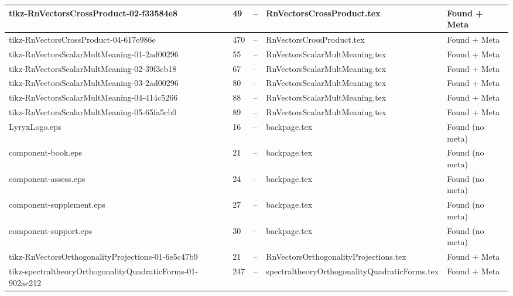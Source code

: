 \documentclass[11pt]{article}
\begin{document}
\begin{longtable}{|p{3.5cm}|p{1.5cm}|p{1cm}|p{4cm}|p{2cm}|}
tikz-RnVectorsCrossProduct-02-f33584e8 & 49 & -- & RnVectorsCrossProduct.tex & \textcolor{found}{Found + Meta} \\
\hline

tikz-RnVectorsCrossProduct-04-617e986e & 470 & -- & RnVectorsCrossProduct.tex & \textcolor{found}{Found + Meta} \\
\hline

tikz-RnVectorsScalarMultMeaning-01-2ad00296 & 55 & -- & RnVectorsScalarMultMeaning.tex & \textcolor{found}{Found + Meta} \\
\hline

tikz-RnVectorsScalarMultMeaning-02-39f3cb18 & 67 & -- & RnVectorsScalarMultMeaning.tex & \textcolor{found}{Found + Meta} \\
\hline

tikz-RnVectorsScalarMultMeaning-03-2ad00296 & 80 & -- & RnVectorsScalarMultMeaning.tex & \textcolor{found}{Found + Meta} \\
\hline

tikz-RnVectorsScalarMultMeaning-04-414c5266 & 88 & -- & RnVectorsScalarMultMeaning.tex & \textcolor{found}{Found + Meta} \\
\hline

tikz-RnVectorsScalarMultMeaning-05-65fa5cb0 & 89 & -- & RnVectorsScalarMultMeaning.tex & \textcolor{found}{Found + Meta} \\
\hline

LyryxLogo.eps & 16 & -- & backpage.tex & \textcolor{warning}{Found (no meta)} \\
\hline

component-book.eps & 21 & -- & backpage.tex & \textcolor{warning}{Found (no meta)} \\
\hline

component-assess.eps & 24 & -- & backpage.tex & \textcolor{warning}{Found (no meta)} \\
\hline

component-supplement.eps & 27 & -- & backpage.tex & \textcolor{warning}{Found (no meta)} \\
\hline

component-support.eps & 30 & -- & backpage.tex & \textcolor{warning}{Found (no meta)} \\
\hline

tikz-RnVectorsOrthogonalityProjections-01-6e5c47b9 & 21 & -- & RnVectorsOrthogonalityProjections.tex & \textcolor{found}{Found + Meta} \\
\hline

tikz-spectraltheoryOrthogonalityQuadraticForms-01-902ae212 & 247 & -- & spectraltheoryOrthogonalityQuadraticForms.tex & \textcolor{found}{Found + Meta} \\
\hline


\end{longtable}
\end{document}
